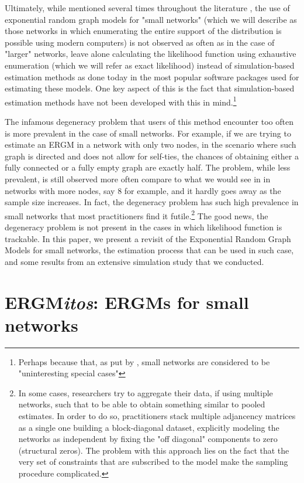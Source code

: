 \documentclass[12pt]{article}
\begin{document}
Ultimately, while mentioned several times throughout the literature \cite{Wasserman1996,Frank1986,Snijders2011}, the use of exponential random graph models for "small networks" (which we will describe as those networks in which enumerating the entire support of the distribution is possible using modern computers) is not observed as often as in the case of "larger" networks, leave alone calculating the likelihood function using exhaustive enumeration (which we will refer as exact likelihood) instead of simulation-based estimation methods as done today in the most popular software packages used for estimating these models. One key aspect of this is the fact that simulation-based estimation methods have not been developed with this in mind.\footnote{Perhaps because that, as put by \cite{Snijders2011}, small networks are considered to be "uninteresting special cases"}

The infamous degeneracy problem \cite{Handcock2003} that users of this method encounter too often is more prevalent in the case of small networks. For example, if we are trying to estimate an ERGM in a network with only two nodes, in the scenario where such graph is directed and does not allow for self-ties, the chances of obtaining either a fully connected or a fully empty graph are exactly half. The problem, while less prevalent, is still observed more often compare to what we would see in in networks with more nodes, say 8 for example, and it hardly goes away as the sample size increases. In fact, the degeneracy problem has such high prevalence in small networks that most practitioners find it futile.\footnote{In some cases, researchers try to aggregate their data, if using multiple networks, such that to be able to obtain something similar to pooled estimates. In order to do so, practitioners stack multiple adjancency matrices as a single one building a block-diagonal dataset, explicitly modeling the networks as independent by fixing the "off diagonal" components to zero (structural zeros). The problem with this approach lies on the fact that the very set of constraints that are subscribed to the model make the sampling procedure complicated.} The good news, the degeneracy problem is not present in the cases in which likelihood function is trackable. In this paper, we present a revisit of the Exponential Random Graph Models for small networks, the estimation process that can be used in such case, and some results from an extensive simulation study that we conducted.

\section{ERGM{\it{}itos}: ERGMs for small networks}
\end{document}
